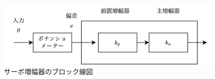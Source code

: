 \begin{figure}
    \centering
    \includegraphics[width=0.8\linewidth]{src/figures/amplifier/amplifier.png}
    \caption{サーボ増幅器のブロック線図}\label{fig:amplifier}
\end{figure}
